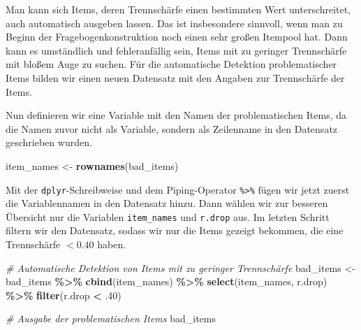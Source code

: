 \documentclass[
  ngerman,
]{book}
\newenvironment{Shaded}{\begin{snugshade}}{\end{snugshade}}
\newcommand{\CommentTok}[1]{\textcolor[rgb]{0.56,0.35,0.01}{\textit{#1}}}
\newcommand{\DecValTok}[1]{\textcolor[rgb]{0.00,0.00,0.81}{#1}}
\newcommand{\FunctionTok}[1]{\textcolor[rgb]{0.13,0.29,0.53}{\textbf{#1}}}
\newcommand{\NormalTok}[1]{#1}
\newcommand{\OtherTok}[1]{\textcolor[rgb]{0.56,0.35,0.01}{#1}}
\newcommand{\SpecialCharTok}[1]{\textcolor[rgb]{0.81,0.36,0.00}{\textbf{#1}}}
\begin{document}
Man kann sich Items, deren Trennschärfe einen bestimmten Wert unterschreitet, auch automatisch ausgeben lassen. Das ist insbesondere sinnvoll, wenn man zu Beginn der Fragebogenkonstruktion noch einen sehr großen Itempool hat. Dann kann es umständlich und fehleranfällig sein, Items mit zu geringer Trennschärfe mit bloßem Auge zu suchen. Für die automatische Detektion problematischer Items bilden wir einen neuen Datensatz mit den Angaben zur Trennschärfe der Items.

\begin{Shaded}
\end{Shaded}

Nun definieren wir eine Variable mit den Namen der problematischen Items, da die Namen zuvor nicht als Variable, sondern als Zeilenname in den Datensatz geschrieben wurden.

\begin{Shaded}
\begin{Highlighting}[]
\NormalTok{item\_names }\OtherTok{\textless{}{-}} \FunctionTok{rownames}\NormalTok{(bad\_items)}
\end{Highlighting}
\end{Shaded}

Mit der \texttt{dplyr}-Schreibweise und dem Piping-Operator \texttt{\%\textgreater{}\%} fügen wir jetzt zuerst die Variablennamen in den Datensatz hinzu. Dann wählen wir zur besseren Übersicht nur die Variablen \texttt{item\_names} und \texttt{r.drop} aus. Im letzten Schritt filtern wir den Datensatz, sodass wir nur die Items gezeigt bekommen, die eine Trennschärfe \(< 0.40\) haben.

\begin{Shaded}
\begin{Highlighting}[]
\CommentTok{\# Automatische Detektion von Items mit zu geringer Trennschärfe}
\NormalTok{bad\_items }\OtherTok{\textless{}{-}}\NormalTok{ bad\_items }\SpecialCharTok{\%\textgreater{}\%} 
  \FunctionTok{cbind}\NormalTok{(item\_names) }\SpecialCharTok{\%\textgreater{}\%}
  \FunctionTok{select}\NormalTok{(item\_names, r.drop) }\SpecialCharTok{\%\textgreater{}\%}
  \FunctionTok{filter}\NormalTok{(r.drop }\SpecialCharTok{\textless{}}\NormalTok{ .}\DecValTok{40}\NormalTok{)}

\CommentTok{\# Ausgabe der problematischen Items}
\NormalTok{bad\_items}
\end{Highlighting}
\end{Shaded}
\end{document}
